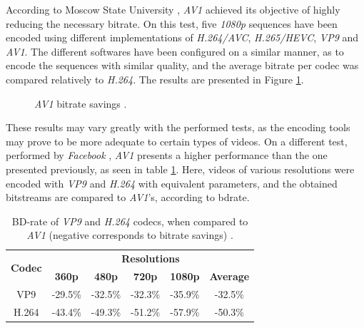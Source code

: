 
According to Moscow State University \cite{vatolinMSUCodecComparison2019}, \emph{AV1} achieved its objective of highly reducing the necessary bitrate. On this test, five \emph{1080p} sequences have been encoded using different implementations of \emph{H.264/AVC}, \emph{H.265/HEVC}, \emph{VP9} and \emph{AV1}. The different softwares have been configured on a similar manner, as to encode the sequences with similar quality, and the average bitrate per codec was compared relatively to \emph{H.264}. The results are presented in Figure \ref{fig:testqual}.

\begin{figure}[!htbp]
    \centering
    
    \caption[\emph{AV1} bitrate savings]{\emph{AV1} bitrate savings \cite{vatolinMSUCodecComparison2019}.} 
    \label{fig:testqual}
\end{figure}

These results may vary greatly with the performed tests, as the encoding tools may prove to be more adequate to certain types of videos. On a different test, performed by \emph{Facebook} \cite{AV1BeatsX2642018}, \emph{AV1} presents a higher performance than the one presented previously, as seen in table \ref{tab:facetest}. Here, videos of various resolutions were encoded with \emph{VP9} and \emph{H.264} with equivalent parameters, and the obtained bitstreams are compared to \emph{AV1}'s, according to \gls{bdrate}.

\begin{table}[h]
    \centering
    \caption[BD-rate of \emph{VP9} and \emph{H.264} codecs, when compared to \emph{AV1} (negative corresponds to bitrate savings)]{BD-rate of \emph{VP9} and \emph{H.264} codecs, when compared to \emph{AV1} (negative corresponds to bitrate savings) \cite{AV1BeatsX2642018}.}
    \begin{tabular}{@{}cccccc@{}} \toprule
        \multirow{2}{*}{\textbf{Codec}}     &      \multicolumn{5}{c}{\textbf{Resolutions}} \\
         & \textbf{360p} & \textbf{480p} & \textbf{720p} & \textbf{1080p} & \textbf{Average}\\ \toprule 
        VP9            &    -29.5\% & -32.5\% & -32.3\% & -35.9\% & -32.5\% \\ \hline
        H.264          &    -43.4\% & -49.3\% & -51.2\% & -57.9\% & -50.3\% \\
        \bottomrule
    \end{tabular}    
    \label{tab:facetest}
\end{table}


